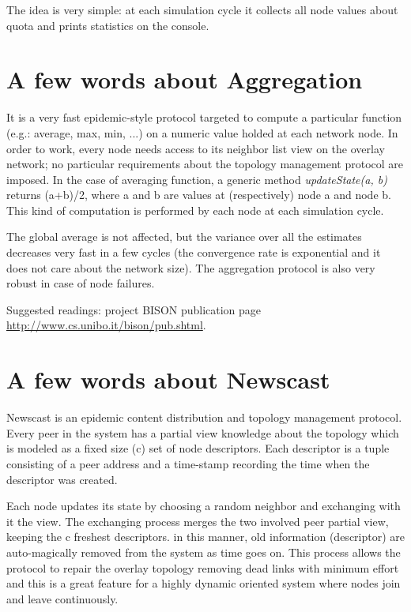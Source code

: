 \documentclass[a4paper,11pt]{article}
\begin{document}
The idea is very simple: at each simulation cycle it collects all
node values about quota and prints statistics on the console.


\appendix
\section{\label{sec:Appendix-A-aggregation}A few words about
Aggregation}

It is a very fast epidemic-style protocol targeted to compute a particular
function (e.g.: average, max, min, ...) on a numeric value holded
at each network node. In order to work, every node needs access to
its neighbor list view on the overlay network; no particular requirements
about the topology management protocol are imposed. In the case of
averaging function, a generic method \emph{updateState(a, b)} returns
(a+b)/2, where a and b are values at (respectively) node a and node
b. This kind of computation is performed by each node at each simulation
cycle.

The global average is not affected, but the variance over all the
estimates decreases very fast in a few cycles (the convergence rate
is exponential and it does not care about the network size). The aggregation
protocol is also very robust in case of node failures. 

Suggested readings: project BISON publication page \url{http://www.cs.unibo.it/bison/pub.shtml}.


\section{\label{sec:Appendix-B-newscast}A few words about Newscast}

Newscast is an epidemic content distribution and topology management
protocol. Every peer in the system has a partial view knowledge about
the topology which is modeled as a fixed size (c) set of node descriptors.
Each descriptor is a tuple consisting of a peer address and a time-stamp
recording the time when the descriptor was created.

Each node updates its state by choosing a random neighbor and exchanging
with it the view. The exchanging process merges the two involved peer
partial view, keeping the c freshest descriptors. in this manner,
old information (descriptor) are auto-magically removed from the system
as time goes on. This process allows the protocol to repair the overlay
topology removing dead links with minimum effort and this is a great
feature for a highly dynamic oriented system where nodes join and
leave continuously. 
\end{document}
